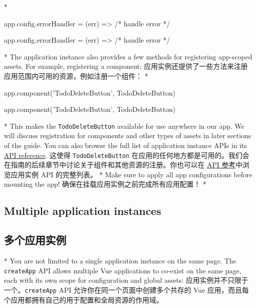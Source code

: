 \begin{paracol}{2}
\switchcolumn[0]*%
\begin{codeJs}
app.config.errorHandler = (err) => {
/* handle error */
}
\end{codeJs}
\switchcolumn
\begin{codeJs}
    app.config.errorHandler = (err) => {
/* handle error */
}
\end{codeJs}

\switchcolumn[0]*%
The application instance also provides a few methods for registering
app-scoped assets. For example, registering a component:
\switchcolumn
应用实例还提供了一些方法来注册应用范围内可用的资源，例如注册一个组件：
\switchcolumn[0]*%
\begin{codeJs}
app.component('TodoDeleteButton', TodoDeleteButton)
\end{codeJs}
\switchcolumn
\begin{codeJs}
app.component('TodoDeleteButton', TodoDeleteButton)
\end{codeJs}

\switchcolumn[0]*%
This makes the \texttt{TodoDeleteButton} available for use anywhere in
our app. We will discuss registration for components and other types of
assets in later sections of the guide. You can also browse the full list
of application instance APIs in its
\href{https://vuejs.org/api/application.html}{API reference}.
\switchcolumn
这使得 \texttt{TodoDeleteButton}
在应用的任何地方都是可用的。我们会在指南的后续章节中讨论关于组件和其他资源的注册。你也可以在
\href{https://cn.vuejs.org/api/application.html}{API 参考}中浏览应用实例
API 的完整列表。
\switchcolumn[0]*%
Make sure to apply all app configurations before mounting the app!
\switchcolumn
确保在挂载应用实例之前完成所有应用配置！
\switchcolumn[0]*%
\subsection{Multiple application instances}
\switchcolumn
\subsection{多个应用实例}
\switchcolumn[0]*%
You are not limited to a single application instance on the same page.
The \texttt{createApp} API allows multiple Vue applications to co-exist
on the same page, each with its own scope for configuration and global
assets:
\switchcolumn
应用实例并不只限于一个。\texttt{createApp} API
允许你在同一个页面中创建多个共存的 Vue
应用，而且每个应用都拥有自己的用于配置和全局资源的作用域。

\end{paracol}
